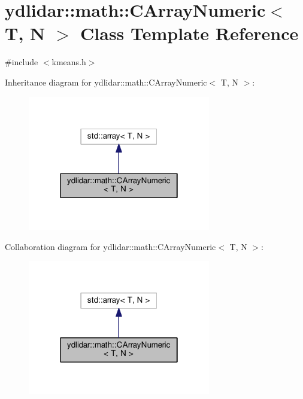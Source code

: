 \hypertarget{classydlidar_1_1math_1_1_c_array_numeric}{}\section{ydlidar\+:\+:math\+:\+:C\+Array\+Numeric$<$ T, N $>$ Class Template Reference}
\label{classydlidar_1_1math_1_1_c_array_numeric}


{\ttfamily \#include $<$kmeans.\+h$>$}



Inheritance diagram for ydlidar\+:\+:math\+:\+:C\+Array\+Numeric$<$ T, N $>$\+:
\nopagebreak
\begin{figure}[H]
\begin{center}
\leavevmode
\includegraphics[width=226pt]{classydlidar_1_1math_1_1_c_array_numeric__inherit__graph}
\end{center}
\end{figure}


Collaboration diagram for ydlidar\+:\+:math\+:\+:C\+Array\+Numeric$<$ T, N $>$\+:
\nopagebreak
\begin{figure}[H]
\begin{center}
\leavevmode
\includegraphics[width=226pt]{classydlidar_1_1math_1_1_c_array_numeric__coll__graph}
\end{center}
\end{figure}
